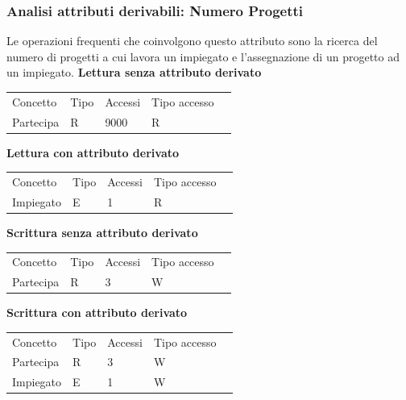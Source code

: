 \documentclass{article}
\begin{document}
\subsubsection{Analisi attributi derivabili: Numero Progetti}
Le operazioni frequenti che coinvolgono questo attributo sono la ricerca del numero di progetti a cui lavora un impiegato e l'assegnazione di un progetto ad un impiegato.
\newline
\newline
\textbf{Lettura senza attributo derivato}
\begin{table}[H]
\renewcommand{\arraystretch}{1.2}
\centering
\begin{tabular}{|p{}|l|l|l|l|}
\cline{1-4}
Concetto & Tipo & Accessi & Tipo accesso\\ \cline{1-4}
Partecipa & R & 9000 & R \\ \cline{1-4}
\end{tabular}
\end{table}
\noindent
\textbf{Lettura con attributo derivato}
\begin{table}[H]
\renewcommand{\arraystretch}{1.2}
\centering
\begin{tabular}{|p{}|l|l|l|l|}
\cline{1-4}
Concetto & Tipo & Accessi & Tipo accesso\\ \cline{1-4}
Impiegato & E & 1 & R \\ \cline{1-4}
\end{tabular}
\end{table}
\noindent
\textbf{Scrittura senza attributo derivato}
\begin{table}[H]
\renewcommand{\arraystretch}{1.2}
\centering
\begin{tabular}{|p{}|l|l|l|l|}
\cline{1-4}
Concetto & Tipo & Accessi & Tipo accesso\\ \cline{1-4}
Partecipa & R & 3 & W \\ \cline{1-4}
\end{tabular}
\end{table}
\noindent
\textbf{Scrittura con attributo derivato}
\begin{table}[H]
\renewcommand{\arraystretch}{1.2}
\centering
\begin{tabular}{|p{}|l|l|l|l|}
\cline{1-4}
Concetto & Tipo & Accessi & Tipo accesso\\ \cline{1-4}
Partecipa & R & 3 & W \\ \cline{1-4}
Impiegato & E & 1 & W \\ \cline{1-4}
\end{tabular}
\end{table}
\end{document}
